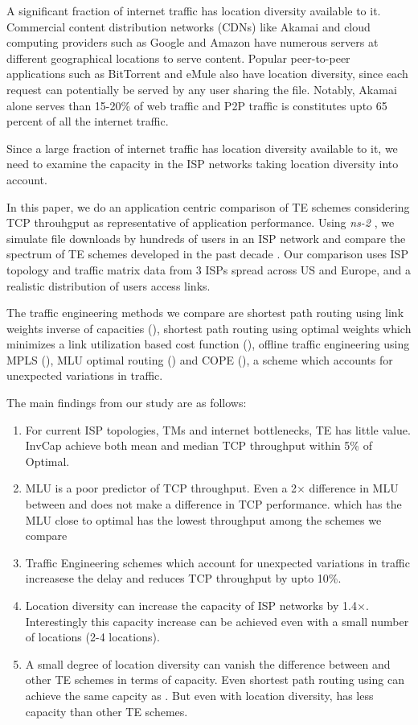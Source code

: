 A significant fraction of internet traffic has location diversity available to it. Commercial content distribution networks (CDNs) like Akamai and cloud computing providers such as Google and Amazon have numerous servers at different geographical locations to serve content\cite{Akamai-stats,GoogleServerLocation}. Popular peer-to-peer applications such as BitTorrent and eMule also have location diversity, since each request can potentially be served by any user sharing the file. Notably, Akamai alone serves than 15-20\% of web traffic \cite{Akamai-stats} and P2P traffic is constitutes upto 65 percent of all the internet traffic\cite{ipoque}.

Since a large fraction of internet traffic has location diversity available to it, we need to examine the capacity in the ISP networks taking location diversity into account.

In this paper, we do an application centric comparison of TE schemes considering TCP throuhgput as representative of application performance. Using  \emph{ns-2} \cite{ns2}, we simulate file downloads by hundreds of users in an ISP network and compare the spectrum of TE schemes developed in the past decade . Our comparison uses ISP topology and traffic matrix data from 3 ISPs spread across US and Europe, and a realistic distribution of users access links.

The traffic engineering methods we compare are shortest path routing using link weights inverse of capacities (\invcap{}), shortest path routing using optimal weights which minimizes a link utilization based cost function (\optwt{}), offline traffic engineering using MPLS (\mplsavg{}), MLU optimal routing (\opt{})  and COPE (\cope{}), a scheme which accounts for unexpected variations in traffic. 

The main findings from our study are as follows:
\begin{enumerate}
\item 
For current ISP topologies, TMs and internet bottlenecks, TE has little value. InvCap achieve both mean and median TCP throughput within 5\% of Optimal.
\item 
MLU is a poor predictor of TCP throughput. Even a 2$\times$ difference in MLU between \opt{} and \invcap{} does not make a difference in TCP performance. \cope{} which has the MLU close to optimal has the lowest throughput among the schemes we compare
\item 
Traffic Engineering schemes which account for unexpected variations in traffic increasese the delay and reduces TCP throughput by upto 10\%.
\item
Location diversity can increase the capacity of ISP networks by 1.4$\times$. Interestingly this capacity increase can be achieved even with a small number of locations (2-4 locations).
\item
A small degree of location diversity can vanish the difference between \opt{} and other TE schemes in terms of capacity.  Even shortest path routing using \optwt{} can achieve the same capcity as \opt{}. But even with location diversity, \invcap{} has less capacity than other TE schemes.
\end{enumerate}

